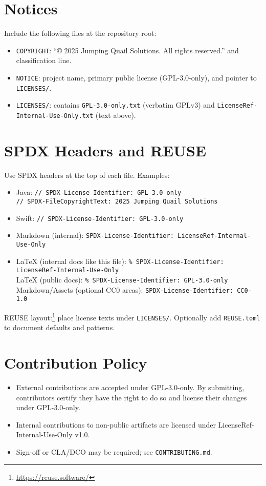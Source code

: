 \documentclass[11pt]{article}
\begin{document}
\section*{Notices}
Include the following files at the repository root:
\begin{itemize}[leftmargin=*]
  \item \texttt{COPYRIGHT}: ``© 2025 Jumping Quail Solutions. All rights reserved.'' and classification line.
  \item \texttt{NOTICE}: project name, primary public license (GPL-3.0-only), and pointer to \texttt{LICENSES/}.
  \item \texttt{LICENSES/}: contains \texttt{GPL-3.0-only.txt} (verbatim GPLv3) and \texttt{LicenseRef-Internal-Use-Only.txt} (text above).
\end{itemize}

\section*{SPDX Headers and REUSE}\label{sec:spdx}
Use SPDX headers at the top of each file. Examples:
\begin{itemize}[leftmargin=*]
  \item Java: \verb|// SPDX-License-Identifier: GPL-3.0-only|\\
        \verb|// SPDX-FileCopyrightText: 2025 Jumping Quail Solutions|
  \item Swift: \verb|// SPDX-License-Identifier: GPL-3.0-only|
  \item Markdown (internal): \verb|SPDX-License-Identifier: LicenseRef-Internal-Use-Only|
  \item LaTeX (internal docs like this file): \verb|% SPDX-License-Identifier: LicenseRef-Internal-Use-Only|
        \\LaTeX (public docs): \verb|% SPDX-License-Identifier: GPL-3.0-only|\\
  Markdown/Assets (optional CC0 areas): \verb|SPDX-License-Identifier: CC0-1.0|
\end{itemize}
REUSE layout:\footnote{\url{https://reuse.software/}} place license texts under \texttt{LICENSES/}. Optionally add \texttt{REUSE.toml} to document defaults and patterns.

\section*{Contribution Policy}
\begin{itemize}[leftmargin=*]
  \item External contributions are accepted under GPL-3.0-only. By submitting, contributors certify they have the right to do so and license their changes under GPL-3.0-only.
  \item Internal contributions to non-public artifacts are licensed under LicenseRef-Internal-Use-Only v1.0.
  \item Sign-off or CLA/DCO may be required; see \texttt{CONTRIBUTING.md}.
\end{itemize}
\end{document}
